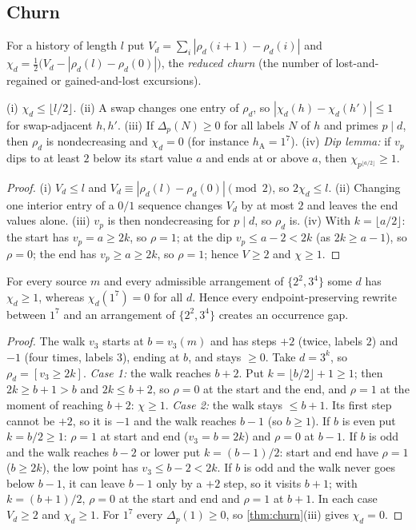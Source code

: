 \subsection{Churn}
For a history of length $l$ put $V_d=\sum_i|\rho_d(i+1)-\rho_d(i)|$ and $\chi_d=\tfrac12\bigl(V_d-|\rho_d(l)-\rho_d(0)|\bigr)$, the \emph{reduced churn} (the number of lost-and-regained or gained-and-lost excursions).
\begin{theorem}\label{thm:churn}
(i) $\chi_d\le\lfloor l/2\rfloor$. (ii) A swap changes one entry of $\rho_d$, so $|\chi_d(h)-\chi_d(h')|\le1$ for swap-adjacent $h,h'$. (iii) If $\Delta_p(N)\ge0$ for all labels $N$ of $h$ and primes $p\mid d$, then $\rho_d$ is nondecreasing and $\chi_d=0$ (for instance $h_{\mathrm A}=1^7$). (iv) \emph{Dip lemma:} if $v_p$ dips to at least $2$ below its start value $a$ and ends at or above $a$, then $\chi_{p^{\lfloor a/2\rfloor}}\ge1$.
\end{theorem}
\begin{proof}
(i) $V_d\le l$ and $V_d\equiv|\rho_d(l)-\rho_d(0)|\pmod 2$, so $2\chi_d\le l$. (ii) Changing one interior entry of a $0/1$ sequence changes $V_d$ by at most $2$ and leaves the end values alone. (iii) $v_p$ is then nondecreasing for $p\mid d$, so $\rho_d$ is. (iv) With $k=\lfloor a/2\rfloor$: the start has $v_p=a\ge 2k$, so $\rho=1$; at the dip $v_p\le a-2<2k$ (as $2k\ge a-1$), so $\rho=0$; the end has $v_p\ge a\ge 2k$, so $\rho=1$; hence $V\ge2$ and $\chi\ge1$.
\end{proof}
\begin{theorem}\label{thm:churnmerger}
For every source $m$ and every admissible arrangement of $\{2^2,3^4\}$ some $d$ has $\chi_d\ge1$, whereas $\chi_d(1^7)=0$ for all $d$. Hence every endpoint-preserving rewrite between $1^7$ and an arrangement of $\{2^2,3^4\}$ creates an occurrence gap.
\end{theorem}
\begin{proof}
The walk $v_3$ starts at $b=v_3(m)$ and has steps $+2$ (twice, labels $2$) and $-1$ (four times, labels $3$), ending at $b$, and stays $\ge0$. Take $d=3^k$, so $\rho_d=[v_3\ge2k]$.
\emph{Case 1:} the walk reaches $b+2$. Put $k=\lfloor b/2\rfloor+1\ge1$; then $2k\ge b+1>b$ and $2k\le b+2$, so $\rho=0$ at the start and the end, and $\rho=1$ at the moment of reaching $b+2$: $\chi\ge1$.
\emph{Case 2:} the walk stays $\le b+1$. Its first step cannot be $+2$, so it is $-1$ and the walk reaches $b-1$ (so $b\ge1$). If $b$ is even put $k=b/2\ge1$: $\rho=1$ at start and end ($v_3=b=2k$) and $\rho=0$ at $b-1$. If $b$ is odd and the walk reaches $b-2$ or lower put $k=(b-1)/2$: start and end have $\rho=1$ ($b\ge2k$), the low point has $v_3\le b-2<2k$. If $b$ is odd and the walk never goes below $b-1$, it can leave $b-1$ only by a $+2$ step, so it visits $b+1$; with $k=(b+1)/2$, $\rho=0$ at the start and end and $\rho=1$ at $b+1$. In each case $V_d\ge2$ and $\chi_d\ge1$. For $1^7$ every $\Delta_p(1)\ge0$, so \cref{thm:churn}(iii) gives $\chi_d=0$.
\end{proof}
